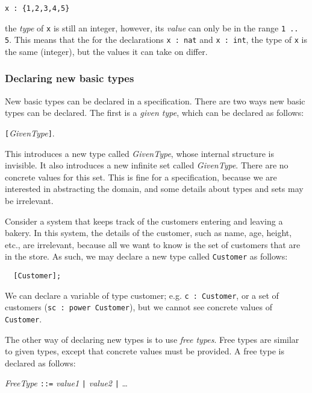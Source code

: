 \quad\quad \texttt{x : \{1,2,3,4,5\}}

the \emph{type} of \texttt{x} is still an integer, however, its \emph{value} can only be in the range \texttt{1 .. 5}. This means that the for the declarations \texttt{x : nat} and \texttt{x : int}, the type of \texttt{x} is the same (integer), but the values it can take on differ.

\subsubsection*{Declaring new basic types}

New basic types can be declared in a specification. There are two ways new basic types can be declared. The first is a \emph{given type}, which can be declared as follows:

\quad\quad \texttt{[}\emph{GivenType}\texttt{]}.

This introduces a new type called \emph{GivenType}, whose internal structure is invisible. It also introduces a new infinite set called \emph{GivenType}. There are no concrete values for this set. This is fine for a specification, because we are interested in abstracting the domain, and some details about types and sets may be irrelevant.

\begin{example}
\label{ex:specification:customer-given-type}
Consider a system that keeps track of the customers  entering and leaving a bakery. In this system, the details of the customer, such as name, age, height, etc., are irrelevant, because all we want to know is the set of customers that are in the store. As such, we may declare a new type called \texttt{Customer} as follows:

\lstset{aboveskip=3mm}
\begin{lstlisting}
  [Customer];
\end{lstlisting}

We can declare a variable of type customer; e.g. \texttt{c : Customer}, or a set of customers (\texttt{sc : power Customer}), but we cannot see concrete values of \texttt{Customer}.

\end{example}

The other way of declaring new types is to use \emph{free types}. Free types are similar to given types, except that concrete values must be provided. A free type is declared as follows:

\quad\quad \emph{FreeType} \texttt{::=} \emph{value1} \texttt{|} \emph{value2} \texttt{|} \ldots

